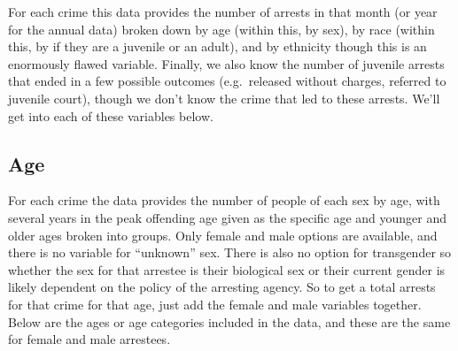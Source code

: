 \documentclass[
]{krantz}
\begin{document}
For each crime this data provides the number of arrests in
that month (or year for the annual data) broken down by age
(within this, by sex), by race (within this, by if they are
a juvenile or an adult), and by ethnicity though this is an
enormously flawed variable. Finally, we also know the number
of juvenile arrests that ended in a few possible outcomes
(e.g.~released without charges, referred to juvenile court),
though we don't know the crime that led to these arrests.
We'll get into each of these variables below.

\subsection{Age}\label{age}

For each crime the data provides the number of people of
each sex by age, with several years in the peak offending
age given as the specific age and younger and older ages
broken into groups. Only female and male options are
available, and there is no variable for ``unknown'' sex.
There is also no option for transgender so whether the sex
for that arrestee is their biological sex or their current
gender is likely dependent on the policy of the arresting
agency. So to get a total arrests for that crime for that
age, just add the female and male variables together. Below
are the ages or age categories included in the data, and
these are the same for female and male arrestees.
\end{document}
